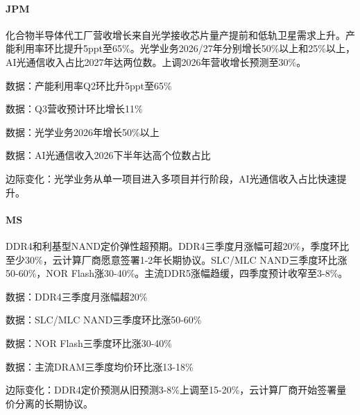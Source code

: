 \documentclass[11pt]{ctexart}
\begin{document}
\paragraph{JPM} 化合物半导体代工厂营收增长来自光学接收芯片量产提前和低轨卫星需求上升。产能利用率环比提升5ppt至65\%。光学业务2026/27年分别增长50\%以上和25\%以上，AI光通信收入占比2027年达两位数。上调2026年营收增长预测至30\%。
{\small\color{refgray}数据：产能利用率Q2环比升5ppt至65\%\par}
{\small\color{refgray}数据：Q3营收预计环比增长11\%\par}
{\small\color{refgray}数据：光学业务2026年增长50\%以上\par}
{\small\color{refgray}数据：AI光通信收入2026下半年达高个位数占比\par}
{\small\color{refgray}边际变化：光学业务从单一项目进入多项目并行阶段，AI光通信收入占比快速提升。\par}
\paragraph{MS} DDR4和利基型NAND定价弹性超预期。DDR4三季度月涨幅可超20\%，季度环比至少30\%，云计算厂商愿意签署1-2年长期协议。SLC/MLC NAND三季度环比涨50-60\%，NOR Flash涨30-40\%。主流DDR5涨幅趋缓，四季度预计收窄至3-8\%。
{\small\color{refgray}数据：DDR4三季度月涨幅超20\%\par}
{\small\color{refgray}数据：SLC/MLC NAND三季度环比涨50-60\%\par}
{\small\color{refgray}数据：NOR Flash三季度环比涨30-40\%\par}
{\small\color{refgray}数据：主流DRAM三季度均价环比涨13-18\%\par}
{\small\color{refgray}边际变化：DDR4定价预测从旧预测3-8\%上调至15-20\%，云计算厂商开始签署量价分离的长期协议。\par}
\end{document}
